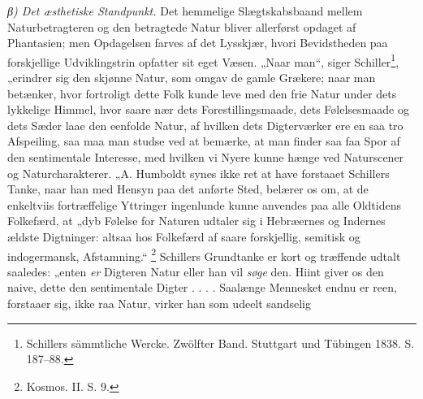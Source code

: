 \documentclass[12pt,a4paper]{book}
\renewcommand{\thefootnote}{*)}
\newcommand{\subrunin}[1]{\emph{#1}\hspace{0.4em}}
\begin{document}
\subrunin{β) Det æsthetiske Standpunkt.} Det hemmelige Slægtskabsbaand
mellem Naturbetragteren og den betragtede Natur bliver allerførst opdaget
af Phantasien; men Opdagelsen farves af det Lysskjær, hvori Bevidstheden
paa forskjellige Udviklingstrin opfatter sit eget Væsen.
„Naar man“, siger Schiller\footnote{Schillers sämmtliche Wercke. Zwölfter
Band. Stuttgart und Tübingen 1838. S. 187--88.}, „erindrer sig den skjønne
Natur, som omgav de gamle Grækere; naar man betænker, hvor fortroligt
dette Folk kunde leve med den frie Natur under dets lykkelige Himmel, hvor
saare nær dets Forestillingsmaade, dets Følelsesmaade og dets Sæder laae
den eenfolde Natur, af hvilken dets Digterværker ere en saa tro
Afspeiling, saa maa man studse ved at bemærke, at man finder saa faa Spor
af den sentimentale Interesse, med hvilken vi Nyere kunne hænge ved
Naturscener og Naturcharakterer. „A. Humboldt synes ikke ret at have
forstaaet Schillers Tanke, naar han med Hensyn paa det anførte Sted,
belærer os om, at de enkeltviis fortræffelige Yttringer ingenlunde kunne
anvendes paa alle Oldtidens Folkefærd, at „dyb Følelse for Naturen udtaler
sig i Hebræernes og Indernes ældste Digtninger: altsaa hos Folkefærd af
saare forskjellig, semitisk og indogermansk, Afstamning.“%
\renewcommand{\thefootnote}{**)}%
\footnote{%
Kosmos. II. S. 9.}%
\renewcommand{\thefootnote}{*)}
Schillers Grundtanke er kort og træffende udtalt saaledes: „enten
\emph{er} Digteren Natur eller han vil \emph{søge} den. Hiint giver os den
naive, dette den sentimentale Digter . . . . Saalænge Mennesket endnu er
reen, forstaaer sig, ikke raa Natur, virker han som udeelt sandselig
\end{document}
